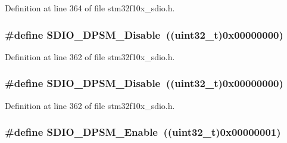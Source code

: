 Definition at line 364 of file stm32f10x\+\_\+sdio.\+h.

\subsubsection[{\texorpdfstring{S\+D\+I\+O\+\_\+\+D\+P\+S\+M\+\_\+\+Disable}{SDIO_DPSM_Disable}}]{\setlength{\rightskip}{0pt plus 5cm}\#define S\+D\+I\+O\+\_\+\+D\+P\+S\+M\+\_\+\+Disable~(({\bf uint32\+\_\+t})0x00000000)}\hypertarget{group___s_d_i_o___d_p_s_m___state_ga156a9f6ab87a46dcb99ddd7462ca064b}{}\label{group___s_d_i_o___d_p_s_m___state_ga156a9f6ab87a46dcb99ddd7462ca064b}


Definition at line 362 of file stm32f10x\+\_\+sdio.\+h.

\subsubsection[{\texorpdfstring{S\+D\+I\+O\+\_\+\+D\+P\+S\+M\+\_\+\+Disable}{SDIO_DPSM_Disable}}]{\setlength{\rightskip}{0pt plus 5cm}\#define S\+D\+I\+O\+\_\+\+D\+P\+S\+M\+\_\+\+Disable~(({\bf uint32\+\_\+t})0x00000000)}\hypertarget{group___s_d_i_o___d_p_s_m___state_ga156a9f6ab87a46dcb99ddd7462ca064b}{}\label{group___s_d_i_o___d_p_s_m___state_ga156a9f6ab87a46dcb99ddd7462ca064b}


Definition at line 362 of file stm32f10x\+\_\+sdio.\+h.

\subsubsection[{\texorpdfstring{S\+D\+I\+O\+\_\+\+D\+P\+S\+M\+\_\+\+Enable}{SDIO_DPSM_Enable}}]{\setlength{\rightskip}{0pt plus 5cm}\#define S\+D\+I\+O\+\_\+\+D\+P\+S\+M\+\_\+\+Enable~(({\bf uint32\+\_\+t})0x00000001)}\hypertarget{group___s_d_i_o___d_p_s_m___state_ga22bc12465c1cf839145619a859276c37}{}\label{group___s_d_i_o___d_p_s_m___state_ga22bc12465c1cf839145619a859276c37}


